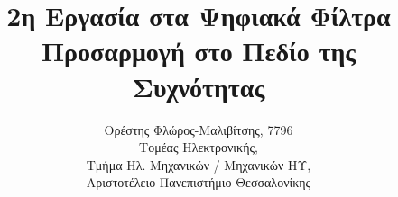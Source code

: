 

\renewcommand{\imageref}[1] {%
\hyperref[fig:#1]{Σχήμα \ref{fig:#1}}}
\renewcommand{\imagerefc}[2] {%
\hyperref[fig:#1]{#2}}

\newcommand{\imagehere}[2]{%
\begin{figure}[H]%
\centering%
\texttt{[image: images/\#1]}%
\caption{#2}
\label{fig:#1}%
\end{figure}%
}

\title{2η Εργασία στα Ψηφιακά Φίλτρα\\
Προσαρμογή στο Πεδίο της Συχνότητας}
\author{Ορέστης Φλώρος-Μαλιβίτσης, 7796\\
Τομέας Ηλεκτρονικής,\\
Τμήμα Ηλ. Μηχανικών / Μηχανικών ΗΥ,\\
Αριστοτέλειο Πανεπιστήμιο Θεσσαλονίκης}

\setcounter{section}{-1} %

\deactivateBG
\maketitle
\tableofcontents
\activateBG





